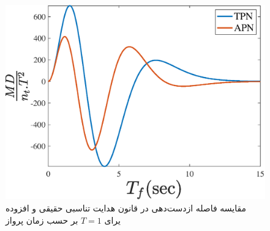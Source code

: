 \begin{figure}[H]
	\centering
	\includegraphics[width=.75\linewidth]{../Figure/Q2/c/n_t_1}
	\caption{مقایسه فاصله ازدست‌دهی در قانون هدایت تناسبی حقیقی و افزوده یرای $T=1$ بر حسب زمان پرواز}
\end{figure}


